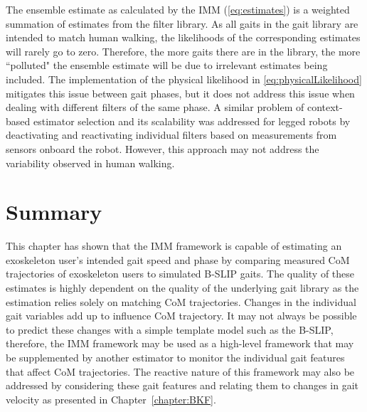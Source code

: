 The ensemble estimate as calculated by the IMM (\ref{eq:estimates}) is a weighted summation of estimates from the filter library. As all gaits in the gait library are intended to match human walking, the likelihoods of the corresponding estimates will rarely go to zero. Therefore, the more gaits there are in the library, the more ``polluted" the ensemble estimate will be due to irrelevant estimates being included. The implementation of the physical likelihood in \eqref{eq:physicalLikelihood} mitigates this issue between gait phases, but it does not address this issue when dealing with different filters of the same phase. A similar problem of context-based estimator selection and its scalability was addressed for legged robots by deactivating and reactivating individual filters \cite{skaff2010context} based on measurements from sensors onboard the robot. However, this approach may not address the variability observed in human walking.

\section{Summary}\label{sec:IMM_summary}
This chapter has shown that the IMM framework is capable of estimating an exoskeleton user's intended gait speed and phase by comparing measured CoM trajectories of exoskeleton users to simulated B-SLIP gaits. The  quality of these estimates is highly dependent on the quality of the underlying gait library as the estimation relies solely on matching CoM trajectories. Changes in the individual gait variables add up to influence CoM trajectory. It may not always be possible to predict these changes with a simple template model such as the B-SLIP, therefore, the IMM framework may be used as a high-level framework that may be supplemented by another estimator to monitor the individual gait features that affect CoM trajectories. The reactive nature of this framework may also be addressed by considering these gait features and relating them to changes in gait velocity as presented in Chapter~\ref{chapter:BKF}.